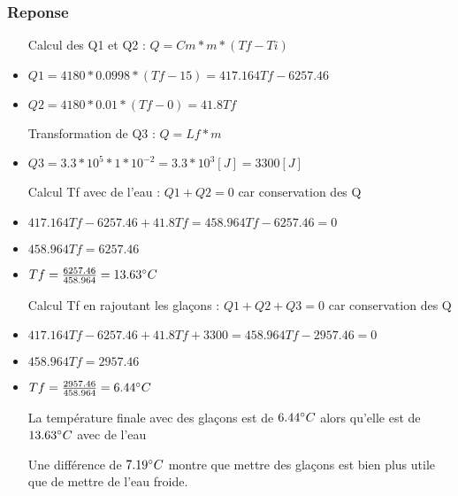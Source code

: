 \subsubsection{Reponse}
\begin{itemize}
    \item[Calcul des Q1 et Q2] : $Q = Cm * m * (Tf-Ti)$
    \item $Q1 = 4180 * 0.0998 * (Tf - 15) = 417.164Tf - 6257.46$
    \item $Q2 = 4180 * 0.01 * (Tf - 0) = 41.8Tf$
    
    \item[Transformation de Q3] : $Q = Lf * m$
    \item $Q3 = 3.3*10^5 * 1*10^{-2} = 3.3*10^3 [J] = 3300[J]$
    
    \item[Calcul Tf avec de l'eau] : $Q1 + Q2 = 0$ car conservation des Q
    \item $417.164Tf - 6257.46 + 41.8Tf = 458.964Tf - 6257.46 = 0$
    \item $458.964Tf = 6257.46$
    \item $Tf = \frac{6257.46}{458.964} = 13.63\celsius$
    
    \item[Calcul Tf en rajoutant les glaçons] : $Q1+Q2+Q3 = 0$ car conservation des Q
    \item $417.164Tf - 6257.46 + 41.8Tf + 3300 = 458.964Tf - 2957.46 = 0$
    \item $458.964Tf = 2957.46$
    \item $Tf = \frac{2957.46}{458.964} = 6.44\celsius$  
    
    \item[La température finale avec des glaçons est de $6.44\celsius$ alors qu'elle est de $13.63\celsius$ avec de l'eau]
    \item[Une différence de $7.19\celsius$ montre que mettre des glaçons est bien plus utile que de mettre de l'eau froide.]  
\end{itemize}
